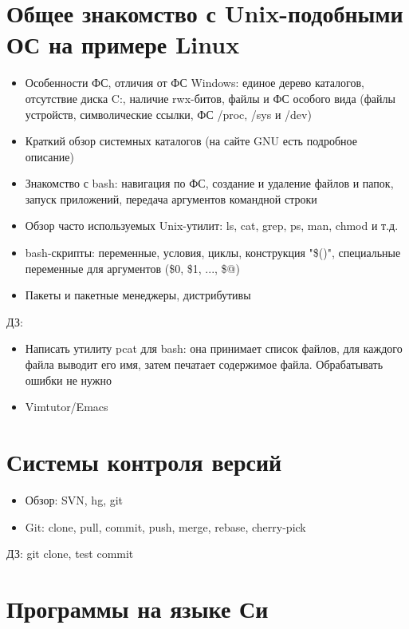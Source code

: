 \documentclass{article}
\begin{document}
\section{Общее знакомство с Unix-подобными ОС на примере Linux}

    \begin{itemize}
        \item Особенности ФС, отличия от ФС Windows: единое дерево каталогов, отсутствие диска C:, наличие rwx-битов, файлы и ФС особого вида (файлы устройств, символические ссылки, ФС /proc, /sys и /dev)
        \item Краткий обзор системных каталогов (на сайте GNU есть подробное описание)
        \item Знакомство с bash: навигация по ФС, создание и удаление файлов и папок, запуск приложений, передача аргументов командной строки
        \item Обзор часто используемых Unix-утилит: ls, cat, grep, ps, man, chmod и т.д.
        \item bash-скрипты: переменные, условия, циклы, конструкция "\$()", специальные переменные для аргументов (\$0, \$1, ..., \$@)
        \item Пакеты и пакетные менеджеры, дистрибутивы
    \end{itemize}

    ДЗ:
    \begin{itemize}
        \item Написать утилиту pcat для bash: она принимает список файлов, для каждого файла выводит его имя, затем печатает содержимое файла. Обрабатывать ошибки не нужно
        \item Vimtutor/Emacs
    \end{itemize}

\section{Системы контроля версий}

    \begin{itemize}
        \item Обзор: SVN, hg, git
        \item Git: clone, pull, commit, push, merge, rebase, cherry-pick
    \end{itemize}

    ДЗ: git clone, test commit

\section{Программы на языке Си}
\end{document}

